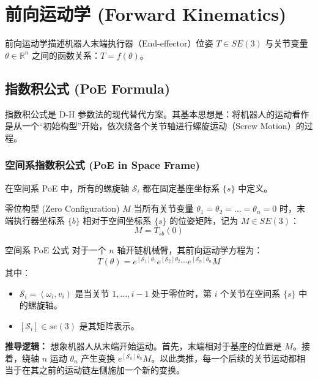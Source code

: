 \chapter{前向运动学 (Forward Kinematics)}

前向运动学描述机器人末端执行器（End-effector）位姿 $T \in SE(3)$ 与关节变量 $\theta \in \mathbb{R}^n$ 之间的函数关系：$T = f(\theta)$。

\section{指数积公式 (PoE Formula)}

指数积公式是 D-H 参数法的现代替代方案。其基本思想是：将机器人的运动看作是从一个“初始构型”开始，依次绕各个关节轴进行螺旋运动（Screw Motion）的过程。

\subsection{空间系指数积公式 (PoE in Space Frame)}



在空间系 PoE 中，所有的螺旋轴 $\mathcal{S}_i$ 都在固定基座坐标系 $\{s\}$ 中定义。

\begin{defbox}{零位构型 (Zero Configuration) $M$}
当所有关节变量 $\theta_1 = \theta_2 = \dots = \theta_n = 0$ 时，末端执行器坐标系 $\{b\}$ 相对于空间坐标系 $\{s\}$ 的位姿矩阵，记为 $M \in SE(3)$：
\[ M = T_{sb}(0) \]
\end{defbox}

\begin{formulabox}{空间系 PoE 公式}
对于一个 $n$ 轴开链机械臂，其前向运动学方程为：
\begin{equation}
T(\theta) = e^{[\mathcal{S}_1]\theta_1} e^{[\mathcal{S}_2]\theta_2} \cdots e^{[\mathcal{S}_n]\theta_n} M
\end{equation}
其中：
\begin{itemize}
    \item $\mathcal{S}_i = (\omega_i, v_i)$ 是当关节 $1, \dots, i-1$ 处于零位时，第 $i$ 个关节在空间系 $\{s\}$ 中的螺旋轴。
    \item $[\mathcal{S}_i] \in se(3)$ 是其矩阵表示。
\end{itemize}
\end{formulabox}

\textbf{推导逻辑：}
想象机器人从末端开始运动。首先，末端相对于基座的位置是 $M$。接着，绕轴 $n$ 运动 $\theta_n$ 产生变换 $e^{[\mathcal{S}_n]\theta_n}M$。以此类推，每一个后续的关节运动都相当于在其之前的运动链左侧施加一个新的变换。

